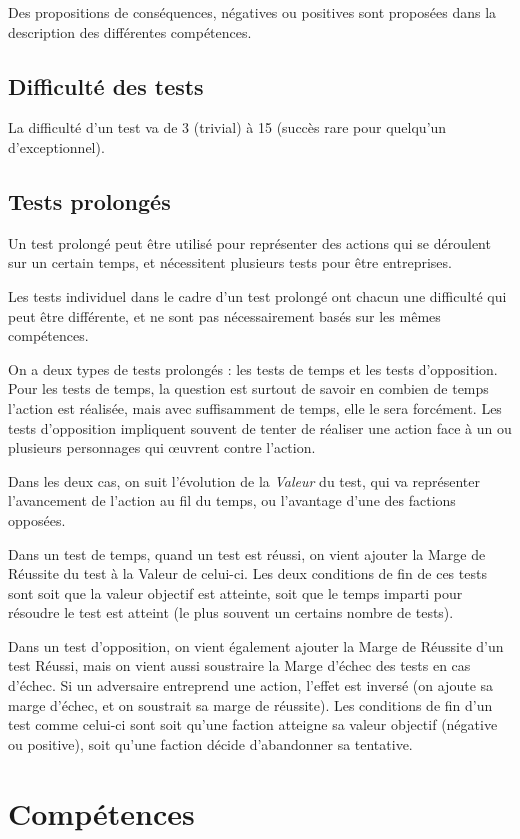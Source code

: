 \documentclass[10pt,a4paper]{book}
\begin{document}
Des propositions de conséquences, négatives ou positives sont proposées dans la description des différentes compétences.
\subsection{Difficulté des tests}
La difficulté d'un test va de 3 (trivial) à 15 (succès rare pour quelqu'un d'exceptionnel).
\subsection{Tests prolongés}
Un test prolongé peut être utilisé pour représenter des actions qui se déroulent sur un certain temps, et nécessitent plusieurs tests  pour être entreprises.

Les tests individuel dans le cadre d'un test prolongé ont chacun une difficulté qui peut être différente, et ne sont pas nécessairement basés sur les mêmes compétences. 

On a deux types de tests prolongés : les tests de temps et les tests d'opposition. Pour les tests de temps, la question est surtout de savoir en combien de temps l'action est réalisée, mais avec suffisamment de temps, elle le sera forcément. Les tests d'opposition impliquent souvent de tenter de réaliser une action face à un ou plusieurs personnages qui œuvrent contre l'action.

Dans les deux cas, on suit l'évolution de la \emph{Valeur} du test, qui va représenter l'avancement de l'action au fil du temps, ou l'avantage d'une des factions opposées.

Dans un test de temps, quand un test est réussi, on vient ajouter la Marge de Réussite du test à la Valeur de celui-ci. Les deux conditions de fin de ces tests sont soit que la valeur objectif est atteinte, soit que le temps imparti pour résoudre le test est atteint (le plus souvent un certains nombre de tests).

Dans un test d'opposition, on vient également ajouter la Marge de Réussite d'un test Réussi, mais on vient aussi soustraire la Marge d'échec des tests en cas d'échec. Si un adversaire entreprend une action, l'effet est inversé (on ajoute sa marge d'échec, et on soustrait sa marge de réussite). Les conditions de fin d'un test comme celui-ci sont soit qu'une faction atteigne sa valeur objectif (négative ou positive), soit qu'une faction décide d'abandonner sa tentative.
\section{Compétences}
\end{document}
